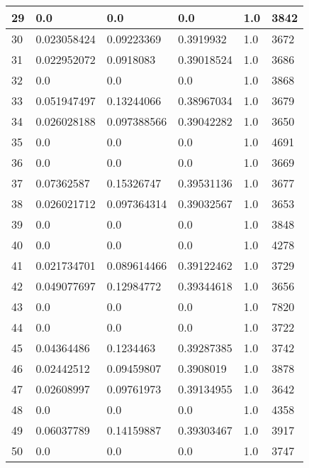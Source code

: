 \begin{longtable}{|l|l|l|l|l|l|}
29 & 0.0 & 0.0 & 0.0 & 1.0 & 3842 \\ \hline 
30 & 0.023058424 & 0.09223369 & 0.3919932 & 1.0 & 3672 \\ \hline 
31 & 0.022952072 & 0.0918083 & 0.39018524 & 1.0 & 3686 \\ \hline 
32 & 0.0 & 0.0 & 0.0 & 1.0 & 3868 \\ \hline 
33 & 0.051947497 & 0.13244066 & 0.38967034 & 1.0 & 3679 \\ \hline 
34 & 0.026028188 & 0.097388566 & 0.39042282 & 1.0 & 3650 \\ \hline 
35 & 0.0 & 0.0 & 0.0 & 1.0 & 4691 \\ \hline 
36 & 0.0 & 0.0 & 0.0 & 1.0 & 3669 \\ \hline 
37 & 0.07362587 & 0.15326747 & 0.39531136 & 1.0 & 3677 \\ \hline 
38 & 0.026021712 & 0.097364314 & 0.39032567 & 1.0 & 3653 \\ \hline 
39 & 0.0 & 0.0 & 0.0 & 1.0 & 3848 \\ \hline 
40 & 0.0 & 0.0 & 0.0 & 1.0 & 4278 \\ \hline 
41 & 0.021734701 & 0.089614466 & 0.39122462 & 1.0 & 3729 \\ \hline 
42 & 0.049077697 & 0.12984772 & 0.39344618 & 1.0 & 3656 \\ \hline 
43 & 0.0 & 0.0 & 0.0 & 1.0 & 7820 \\ \hline 
44 & 0.0 & 0.0 & 0.0 & 1.0 & 3722 \\ \hline 
45 & 0.04364486 & 0.1234463 & 0.39287385 & 1.0 & 3742 \\ \hline 
46 & 0.02442512 & 0.09459807 & 0.3908019 & 1.0 & 3878 \\ \hline 
47 & 0.02608997 & 0.09761973 & 0.39134955 & 1.0 & 3642 \\ \hline 
48 & 0.0 & 0.0 & 0.0 & 1.0 & 4358 \\ \hline 
49 & 0.06037789 & 0.14159887 & 0.39303467 & 1.0 & 3917 \\ \hline 
50 & 0.0 & 0.0 & 0.0 & 1.0 & 3747 \\ \hline 
\end{longtable}